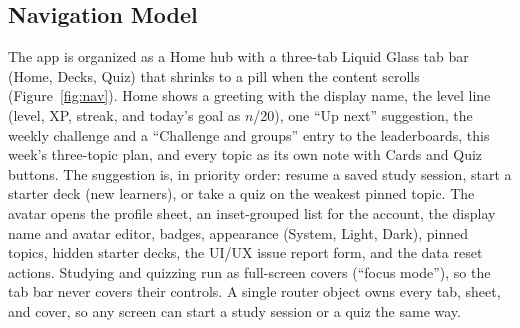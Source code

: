 \documentclass[12pt,letterpaper]{article}
\begin{document}
\subsection{Navigation Model}
The app is organized as a Home hub with a three-tab Liquid Glass tab bar (Home, Decks,
Quiz) that shrinks to a pill when the content scrolls (Figure~\ref{fig:nav}). Home shows
a greeting with the display name, the level line (level, XP, streak, and today's goal
as $n$/20), one ``Up next'' suggestion, the weekly challenge and a ``Challenge and
groups'' entry to the leaderboards, this week's three-topic plan, and every topic as
its own note with Cards and Quiz buttons. The suggestion is, in
priority order: resume a saved study session, start a starter deck (new learners), or
take a quiz on the weakest pinned topic. The avatar opens the profile sheet, an
inset-grouped list for the account, the display name and avatar editor, badges,
appearance (System, Light, Dark), pinned topics, hidden starter decks, the UI/UX issue
report form, and the data reset actions. Studying and quizzing run as
full-screen covers (``focus mode''), so the tab bar never covers their controls. A
single router object owns every tab, sheet, and cover, so any screen can start a study
session or a quiz the same way.
\end{document}

